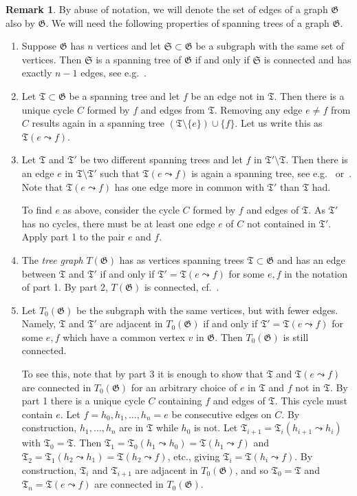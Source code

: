 \documentclass[11pt]{amsart}
\theoremstyle{definition}
\newtheorem{remark}[thm]{Remark}
\numberwithin{equation}{section}
\def\fG{\mathfrak{G}}
\def\fT{{\mathfrak{T}}}
\begin{document}
\begin{remark}\label{rmk:cycle-switch}
By abuse of notation, we will denote the set of edges of a graph $\fG$ also by $\fG$. We will need the following properties of spanning trees of a graph $\fG$.
\begin{enumerate}
\item Suppose $\fG$ has $n$ vertices and let $\mathfrak{S} \subset \fG$ be a subgraph with the same set of vertices. Then $\mathfrak{S}$ is a spanning tree of $\fG$ if and only if $\mathfrak{S}$ is connected and has exactly $n-1$ edges, see e.g.\ \cite[Thm.\,2.1.4]{West-graphtheory}.

\item Let $\fT \subset \fG$ be a spanning tree and let $f$ be an edge not in $\fT$. Then there is a unique cycle $C$ formed by $f$ and edges from $\fT$. Removing any edge $e \neq f$ from $C$ results again in a spanning tree $(\fT \setminus \{e\}) \cup \{f\}$. Let us write this as $\fT(e \leadsto f)$. 

\item Let $\fT$ and $\fT'$ be two different spanning trees and let $f$ in $\fT'\setminus \fT$. Then there is an edge $e$ in $\fT\setminus \fT'$ such that $\fT(e\leadsto f)$ is again a spanning tree, see e.g.~\cite[Prop.\,2.1.7]{West-graphtheory} or~\cite[Ex.\,5.8]{Grinberg-2023}. Note that $\fT(e\leadsto f)$ has one edge more in common with $\fT'$ than $\fT$ had.

To find $e$ as above, consider the cycle $C$ formed by $f$ and edges of $\fT$. As $\fT'$ has no cycles, there must be at least one edge $e$ of $C$ not contained in $\fT'$. Apply part 1 to the pair $e$ and $f$.

\item The \textit{tree graph} $T(\fG)$ has as vertices spanning trees $\fT \subset \fG$ and has an edge between $\fT$ and $\fT'$ if and only if $\fT'=\fT(e \leadsto f)$ for some $e,f$ in the notation of part 1.
By part 2, $T(\fG)$ is connected, cf.\ \cite[Ex.\,5.9]{Grinberg-2023}.

\item Let $T_0(\fG)$ be the subgraph with the same vertices, but with fewer edges. Namely, $\fT$ and $\fT'$ are adjacent in $T_0(\fG)$ if and only if $\fT'=\fT(e \leadsto f)$ for some $e,f$ which have a common vertex $v$ in $\fG$. Then $T_0(\fG)$ is still connected.

To see this, note that by part 3 it is enough to show that $\fT$ and $\fT(e\leadsto f)$ are connected in $T_0(\fG)$ for an arbitrary choice of $e$ in $\fT$ and $f$ not in $\fT$. By part 1 there is a unique cycle $C$ containing $f$ and edges of $\fT$. This cycle must contain $e$. Let $f= h_0,h_1,\dots,h_n=e$ be consecutive edges on $C$. By construction, $h_1,\dots,h_n$ are in $\fT$ while $h_0$ is not. Let $\fT_{i+1} = \fT_i(h_{i+1} \leadsto h_i)$ with $\fT_0=\fT$. Then $\fT_1 = \fT_0(h_1 \leadsto h_0) = \fT(h_1 \leadsto f)$ and $\fT_2 = \fT_1(h_2 \leadsto h_1) = \fT(h_2 \leadsto f)$, etc., giving $\fT_i = \fT(h_i \leadsto f)$. By construction, $\fT_i$ and $\fT_{i+1}$ are adjacent in $T_0(\fG)$, and so $\fT_0 = \fT$ and $\fT_n = \fT(e \leadsto f)$ are connected in $T_0(\fG)$.
\end{enumerate}
\end{remark}
\end{document}
